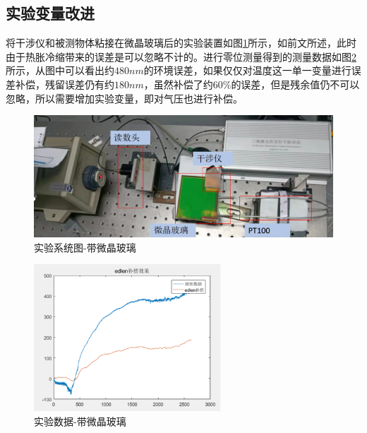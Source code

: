 \subsection{实验变量改进}
将干涉仪和被测物体粘接在微晶玻璃后的实验装置如图\ref{fig:实验系统图-带微晶玻璃}所示，如前文所述，此时由于热胀冷缩带来的误差是可以忽略不计的。进行零位测量得到的测量数据如图\ref{fig:实验数据-带微晶玻璃}所示，从图中可以看出约$480nm$的环境误差，如果仅仅对温度这一单一变量进行误差补偿，残留误差仍有约$180nm$，虽然补偿了约$60\%$的误差，但是残余值仍不可以忽略，所以需要增加实验变量，即对气压也进行补偿。
\begin{figure}[htb]
  \centering
  \includegraphics[width=12cm]{fig/3-fig/实验系统图-带微晶玻璃.jpg}
  \caption{实验系统图-带微晶玻璃}
  \label{fig:实验系统图-带微晶玻璃}
\end{figure}
\begin{figure}[htb]
  \centering
  \includegraphics[width=7cm]{fig/3-fig/实验数据-带微晶玻璃.jpg}
  \caption{实验数据-带微晶玻璃}
  \label{fig:实验数据-带微晶玻璃}
\end{figure}

